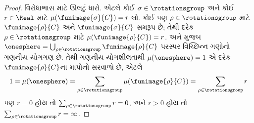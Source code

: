 \documentclass[../../../include/open-logic-section]{subfiles}
\begin{document}
\begin{proof}
વિરોધાભાસ માટે ઊલટું ધારો.
એટલે કોઈ $\sigma \in
\rotationsgroup$ અને કોઈ
$r \in \Real$ માટે
$\mu(\funimage{\sigma}{C}) = r$
લો. કોઈ પણ $\rho \in
\rotationsgroup$ માટે
$\funimage{\rho}{C}$ અને
$\funimage{\sigma}{C}$ સમરૂપ
છે; તેથી દરેક $\rho \in
\rotationsgroup$ માટે
$\mu(\funimage{\rho}{C}) = r$.
 અને
 મુજબ
$\onesphere = \bigcup_{\rho \in
\rotationsgroup}\funimage{\rho}{C}$
પરસ્પર વિચ્છિન્ન ગણોનો
ગણનીય યોગગણ છે. તેથી
ગણનીય યોગશીલતાથી
$\mu(\onesphere) = 1$ એ
દરેક $\funimage{\rho}{C}$ના
માપોનો સરવાળો છે, એટલે
\[
	1 = \mu(\onesphere) = \sum_{\rho \in \rotationsgroup}\mu(\funimage{\rho}{C}) = \sum_{\rho \in \rotationsgroup}r
\]
પણ $r = 0$ હોય તો
$\sum_{\rho \in \rotationsgroup}r = 0$,
અને $r > 0$ હોય તો
$\sum_{\rho \in \rotationsgroup}r = \infty$.
\end{proof}
\end{document}
